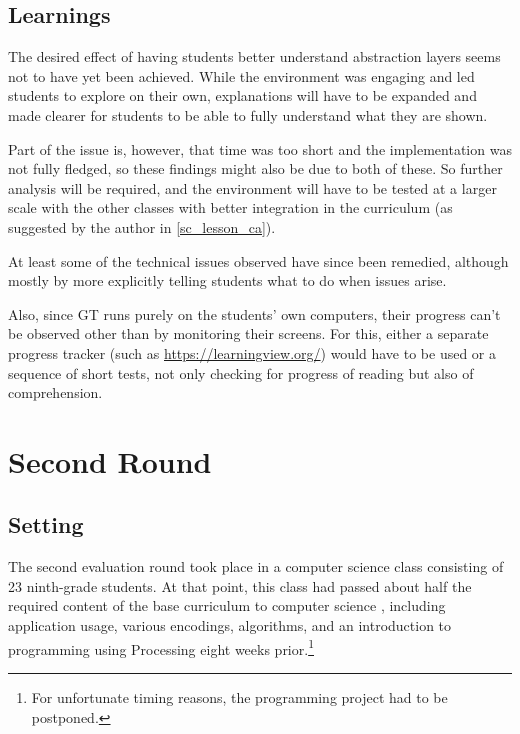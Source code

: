 \subsection{Learnings}

The desired effect of having students better understand abstraction layers seems not to have yet been achieved. While the environment was engaging and led students to explore on their own, explanations will have to be expanded and made clearer for students to be able to fully understand what they are shown.

Part of the issue is, however, that time was too short and the implementation was not fully fledged, so these findings might also be due to both of these. So further analysis will be required, and the environment will have to be tested at a larger scale with the other classes with better integration in the curriculum (as suggested by the author in \ref{sc_lesson_ca}).

At least some of the technical issues observed have since been remedied, although mostly by more explicitly telling students what to do when issues arise.

Also, since \ac{GT} runs purely on the students' own computers, their progress can't be observed other than by monitoring their screens. For this, either a separate progress tracker (such as \url{https://learningview.org/}) would have to be used or a sequence of short tests, not only checking for progress of reading but also of comprehension.



\section{Second Round} \label{sc_validation_compiler} %

\subsection{Setting}

The second evaluation round took place in a computer science class consisting of 23 ninth-grade students. At that point, this class had passed about half the required content of the base curriculum to computer science \cite[p.\,145--146]{Erz16}, including application usage, various encodings, algorithms, and an introduction to programming using Processing eight weeks prior.\footnote{For unfortunate timing reasons, the programming project had to be postponed.}

